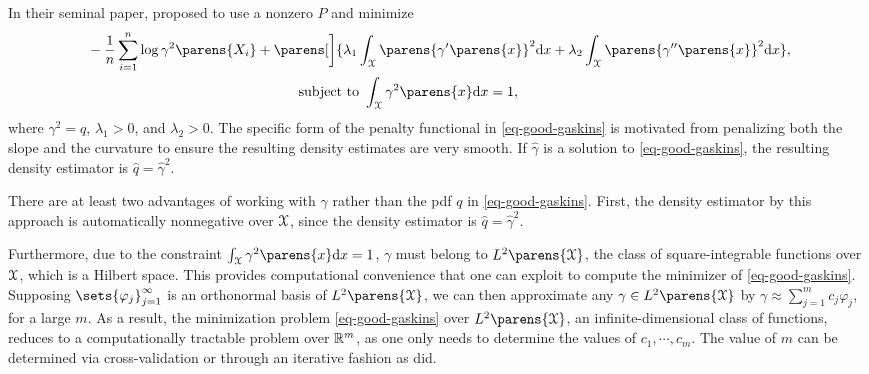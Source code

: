 
In their seminal paper, \textcite{Good1971-gm} proposed to use a nonzero $P$ and minimize  
\begin{equation}\label{eq-good-gaskins}
	\begin{aligned}
		& \, - \frac{1}{n} \sum_{i=1}^n \log \gamma^2 \parens{X_i} +  \parens[\bigg]{\lambda_1 \int_{\calX} \parens{\gamma' \parens{x}}^2 \diff x + \lambda_2 \int_{\calX} \parens{\gamma'' \parens{x}}^2 \diff x  }, \\ 
		& \qquad \qquad \qquad \qquad \qquad \qquad \qquad \quad \text{ subject to } \int_{\calX} \gamma^2 \parens{x} \diff x = 1, 
	\end{aligned}
\end{equation}
where $\gamma^2 = q$, $\lambda_1 > 0$, and $\lambda_2 > 0$. The specific form of the penalty functional in \eqref{eq-good-gaskins} is motivated from penalizing both the slope and the curvature to ensure the resulting density estimates are very smooth. If $\hat{\gamma}$ is a solution to \eqref{eq-good-gaskins}, the resulting density estimator is $\hat{q} = \hat{\gamma}^2$. 

There are at least two advantages of working with $\gamma$ rather than the pdf $q$ in \eqref{eq-good-gaskins}. 
First, the density estimator by this approach is automatically nonnegative over $\mathcal{X}$, since the density estimator is $\hat{q} = \hat{\gamma}^2$. 

Furthermore, due to the constraint $\int_{\calX} \gamma^2 \parens{x} \diff x = 1$, $\gamma$ must belong to $L^2 \parens{\calX}$, the class of square-integrable functions over $\mathcal{X}$, which is a Hilbert space. This provides computational convenience that one can exploit to compute the minimizer of \eqref{eq-good-gaskins}. Supposing $\sets{\varphi_j}_{j=1}^{\infty}$ is an orthonormal basis of $L^2 \parens{\calX}$, we can then approximate any $\gamma \in L^2 \parens{\calX}$ by $\gamma \approx \sum_{j=1}^{m} c_j \varphi_j$, for a large $m$. As a result, the minimization problem \eqref{eq-good-gaskins} over $L^2 \parens{\calX}$, an infinite-dimensional class of functions, reduces to a computationally tractable problem over $\mathbb{R}^m$, as one only needs to determine the values of $c_1, \cdots, c_m$. The value of $m$ can be determined via cross-validation or through an iterative fashion as \textcites{Good1971-gm} did. 

